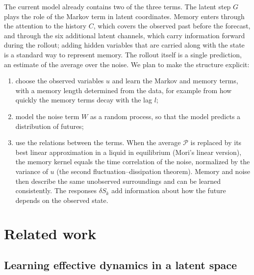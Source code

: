 \documentclass[11pt,a4paper]{article}
\numberwithin{equation}{section}
\begin{document}
The current model already contains two of the three terms. The latent step $G$
plays the role of the Markov term in latent coordinates. Memory enters through the
attention to the history $C$, which covers the observed past before the forecast,
and through the six additional latent channels, which carry information forward
during the rollout; adding hidden variables that are carried along with the state
is a standard way to represent memory. The rollout itself is a single prediction,
an estimate of the average over the noise. We plan to make the structure explicit:
\begin{enumerate}[label=(\roman*),leftmargin=2em]
\item choose the observed variables $u$ and learn the Markov and memory terms, with a
  memory length determined from the data, for example from how quickly the memory terms
  decay with the lag $l$;
\item model the noise term $W$ as a random process, so that the model predicts a
  distribution of futures;
\item use the relations between the terms. When the average $\mathcal P$ is replaced by its
  best linear approximation in a liquid in equilibrium (Mori's linear version), the memory
  kernel equals the time correlation of the noise, normalized by the variance of $u$ (the
  second fluctuation--dissipation theorem). Memory and noise then describe the same
  unobserved surroundings and can be learned consistently. The responses $\delta S_k$ add
  information about how the future depends on the observed state.
\end{enumerate}

\section{Related work}
\label{sec:related}

\subsection{Learning effective dynamics in a latent space}
\end{document}
